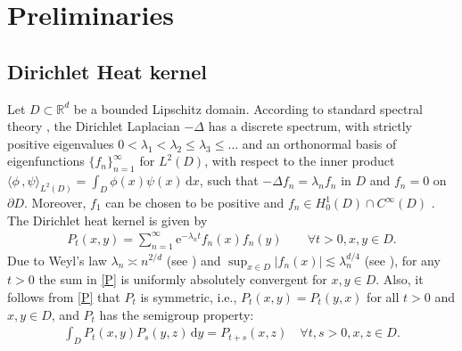 \documentclass[reqno]{amsart}
\newcommand{\R}{\mathbb R}
\renewcommand{\d}{\mathrm d}
\newcommand{\e}{\mathrm e}
\newcommand{\1}{\mathbf 1}
\numberwithin{equation}{section}
\theoremstyle{definition}
\begin{document}
\section{Preliminaries}\label{s:pre}

\subsection{Dirichlet Heat kernel}

Let $D\subset \R^d$ be a bounded Lipschitz domain.
According to standard spectral theory \cite{Davies,McLean}, the Dirichlet Laplacian $-\Delta$ has a discrete spectrum, with strictly positive eigenvalues $0<\lambda_1 < \lambda_2 \le \lambda_3 \le \dots$ and an orthonormal basis of eigenfunctions $\{f_n\}_{n=1}^\infty$ for $L^2(D)$, with respect to the inner product $\langle \phi\,,\psi\rangle_{L^2(D)} = \int_D \phi(x) \psi(x)\, \d x$, such that $-\Delta f_n = \lambda_n f_n$ in $D$ and $f_n=0$ on $\partial D$.
Moreover, $f_1$ can be chosen to be positive \cite[Proposition 1.4.3]{Davies} and $f_n \in H^1_0(D) \cap C^\infty(D)$ \cite[Theorem 9.31]{Brezis}.
The Dirichlet heat kernel is given by
\begin{align}\label{P}
    P_t(x,y) = \sum_{n=1}^\infty \e^{-\lambda_n t} f_n(x) f_n(y) \qquad \forall t > 0, x, y \in D.
\end{align}
Due to Weyl's law $\lambda_n \asymp n^{2/d}$ (see \cite[Corollary 3.15]{FLW}) and $\sup_{x \in D}|f_n(x)|\lesssim \lambda_n^{d/4}$ (see \cite[Proposition 5]{F95}), for any $t>0$ the sum in \eqref{P} is uniformly absolutely convergent for $x,y\in D$.
Also, it follows from \eqref{P} that $P_t$ is symmetric, i.e., $P_t(x,y) = P_t(y,x)$ for all $t>0$ and $x,y\in D$, and $P_t$ has the semigroup property:
\begin{align}\label{semigroup}
    \int_D P_t(x,y) P_s(y,z) \, \d y = P_{t+s}(x,z) \quad \forall t,s>0, x,z \in D.
\end{align}
\end{document}
